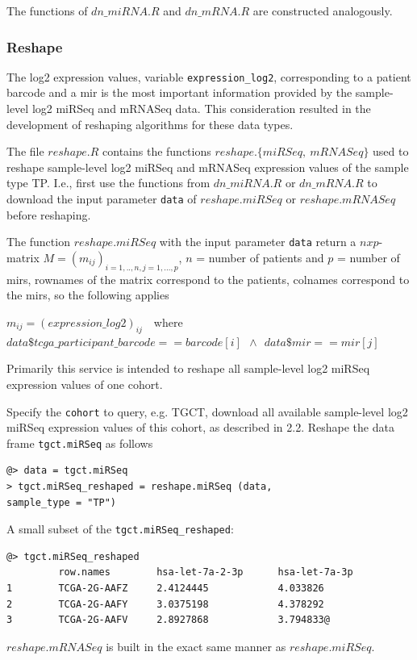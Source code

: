 \documentclass{TechReport}
\begin{document}
The functions of $dn\_miRNA.R$ and $dn\_mRNA.R$ are constructed analogously.


\subsubsection{Reshape}
The log2 expression values, variable {\tt expression\_log2}, corresponding to a
patient barcode and a mir is the most important information provided by 
the sample-level log2 miRSeq and mRNASeq data. This consideration resulted in the
development of reshaping algorithms for these data types.

The file $reshape.R$ contains the functions $reshape.\{miRSeq,\ mRNASeq\}$
used to reshape sample-level log2 miRSeq and mRNASeq 
expression values of the sample type TP. I.e., first use the functions from 
$dn\_miRNA.R$ or $dn\_mRNA.R$ to download the input parameter {\tt data}
of $reshape.miRSeq$ or $reshape.mRNASeq$ before reshaping. 

The function $reshape.miRSeq$ with the input parameter {\tt data} return a
$nxp$-matrix $M = (m_{ij})_{i=1,..,n, j=1,...,p}$, $n$ = number of patients and 
$p$ = number of mirs, rownames of the matrix correspond to the patients, colnames
correspond to the mirs,  so the following applies
\begin{center}
$m_{ij}= (expression\_log2)_{ij}$\ \  where \\
$data\$tcga\_participant\_barcode==barcode[i]\ \  \wedge\ \ data\$mir==mir[j] $
\end{center}
Primarily this service is intended to reshape all sample-level log2 miRSeq
expression values of one cohort. 

Specify the {\tt cohort} to query, e.g. TGCT, download all available sample-level
log2 miRSeq expression values of this cohort, as described 
in 2.2.
Reshape the data frame {\tt tgct.miRSeq} as follows
\begin{lstlisting}[style=base]
@> data = tgct.miRSeq
> tgct.miRSeq_reshaped = reshape.miRSeq (data, 
sample_type = "TP")
\end{lstlisting}
A small subset of the {\tt tgct.miRSeq\_reshaped}:
\begin{lstlisting}[style=base]
@> tgct.miRSeq_reshaped
         row.names        hsa-let-7a-2-3p      hsa-let-7a-3p
1        TCGA-2G-AAFZ     2.4124445            4.033826
2        TCGA-2G-AAFY     3.0375198            4.378292
3        TCGA-2G-AAFV     2.8927868            3.794833@
\end{lstlisting}
$reshape.mRNASeq$ is built in the exact same manner as $reshape.miRSeq$.
\end{document}
